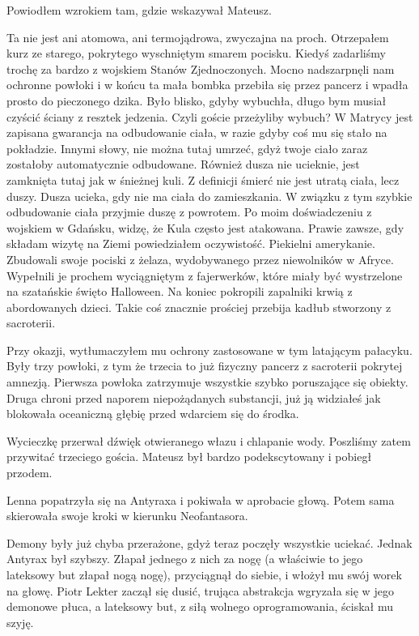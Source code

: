 
Powiodłem wzrokiem tam, gdzie wskazywał Mateusz.
\begin{dialogue}
\ds{} Ta nie jest ani atomowa, ani termojądrowa, zwyczajna na proch. \dm{} Otrzepałem kurz ze starego, pokrytego wyschniętym smarem pocisku. \dm{} 
Kiedyś zadarliśmy trochę za bardzo z wojskiem Stanów Zjednoczonych. 
Mocno nadszarpnęli nam ochronne powłoki i w końcu ta mała bombka przebiła się przez pancerz i wpadła prosto do pieczonego dzika.
Było blisko, gdyby wybuchła, długo bym musiał czyścić ściany z resztek jedzenia.
\ds{} Czyli goście przeżyliby wybuch?
\ds{} W Matrycy jest zapisana gwarancja na odbudowanie ciała, w razie gdyby coś mu się stało na pokładzie. 
Innymi słowy, nie można tutaj umrzeć, gdyż twoje ciało zaraz zostałoby automatycznie odbudowane.
Również dusza nie ucieknie, jest zamknięta tutaj jak w śnieżnej kuli.
Z definicji śmierć nie jest utratą ciała, lecz duszy. Dusza ucieka, gdy nie ma ciała do zamieszkania. W związku z tym szybkie odbudowanie ciała przyjmie duszę z powrotem.
\ds{} Po moim doświadczeniu z wojskiem w Gdańsku, widzę, że Kula często jest atakowana.
\ds{} Prawie zawsze, gdy składam wizytę na Ziemi \dm{} powiedziałem oczywistość. \dm{} Piekielni amerykanie. 
Zbudowali swoje pociski z żelaza, wydobywanego przez niewolników w Afryce.
Wypełnili je prochem wyciągniętym z fajerwerków, które miały być wystrzelone na szatańskie święto Halloween. 
Na koniec pokropili zapalniki krwią z abordowanych dzieci.
Takie coś znacznie prościej przebija kadłub stworzony z sacroterii.
\end{dialogue}

Przy okazji, wytłumaczyłem mu ochrony zastosowane w tym latającym pałacyku. 
Były trzy powłoki, z tym że trzecia to już fizyczny pancerz z sacroterii pokrytej amnezją.
Pierwsza powłoka zatrzymuje wszystkie szybko poruszające się obiekty.
Druga chroni przed naporem niepożądanych substancji, już ją widziałeś jak blokowała oceaniczną głębię przed wdarciem się do środka.

Wycieczkę przerwał dźwięk otwieranego włazu i chlapanie wody.
Poszliśmy zatem przywitać trzeciego gościa. 
Mateusz był bardzo podekscytowany i pobiegł przodem.

\divider{}

Lenna popatrzyła się na Antyraxa i pokiwała w aprobacie głową.
Potem sama skierowała swoje kroki w kierunku Neofantasora.

Demony były już chyba przerażone, gdyż teraz poczęły wszystkie uciekać.
Jednak Antyrax był szybszy. Złapał jednego z nich za nogę (a właściwie to jego lateksowy but złapał nogą nogę), przyciągnął do siebie, i włożył mu swój worek na głowę.
Piotr Lekter zaczął się dusić, trująca abstrakcja wgryzała się w jego demonowe płuca, a lateksowy but, z siłą wolnego oprogramowania, ściskał mu szyję.

